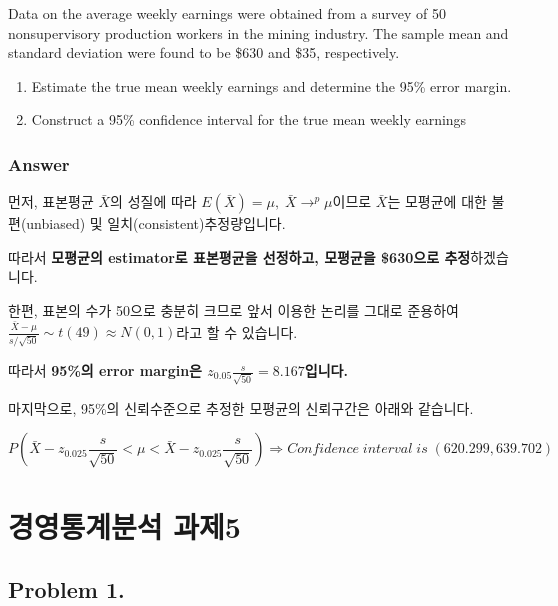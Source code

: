 \documentclass[
  a4paper,
  DIV=11,
  numbers=noendperiod]{scrreprt}
\providecommand{\tightlist}{%
  \setlength{\itemsep}{0pt}\setlength{\parskip}{0pt}}\usepackage{longtable,booktabs,array}
\begin{document}

Data on the average weekly earnings were obtained from a survey of 50
nonsupervisory production workers in the mining industry. The sample
mean and standard deviation were found to be \$630 and \$35,
respectively.

\begin{enumerate}
\def\labelenumi{(\alph{enumi})}
\tightlist
\item
  Estimate the true mean weekly earnings and determine the 95\% error
  margin.
\item
  Construct a 95\% confidence interval for the true mean weekly earnings
\end{enumerate}

\subsection*{Answer}\label{answer-25}

먼저, 표본평균 \(\bar{X}\)의 성질에 따라
\(E(\bar{X})=\mu,\;\bar{X}\rightarrow^p \mu\)이므로 \(\bar{X}\)는
모평균에 대한 불편(unbiased) 및 일치(consistent)추정량입니다.

따라서 \textbf{모평균의 estimator로 표본평균을 선정하고, 모평균을
\$630으로 추정}하겠습니다.

한편, 표본의 수가 50으로 충분히 크므로 앞서 이용한 논리를 그대로
준용하여 \(\frac{\bar{X}-\mu}{s/\sqrt{50}}\sim t(49)\approx N(0,1)\)라고
할 수 있습니다.

따라서 \textbf{95\%의 error margin은
\(z_{0.05}\frac{s}{\sqrt{50}}=8.167\)입니다.}

마지막으로, 95\%의 신뢰수준으로 추정한 모평균의 신뢰구간은 아래와
같습니다.

\[P(\bar{X}-z_{0.025}\frac{s}{\sqrt{50}}<\mu<\bar{X}-z_{0.025}\frac{s}{\sqrt{50}})\Rightarrow Confidence\;interval\;is\;(620.299,639.702)\]

\chapter*{경영통계분석
과제5}\label{uxacbduxc601uxd1b5uxacc4uxbd84uxc11d-uxacfcuxc81c5}


\section*{Problem 1.}\label{problem-1.-2}
\end{document}
